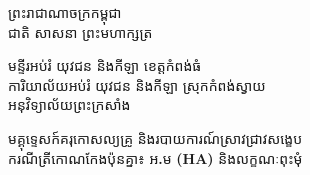 \documentclass[a4paper,12pt]{article}
\newcommand{\enbf}[1]{{\TimesEn\textbf{#1}}}
\newcommand{\khmflourish}{{\Tacteing\fontsize{38pt}{15pt}\selectfont\raisebox{-5pt}{3}}}
\newcommand{\parttitle}[1]{{\muol\fontsize{13pt}{17pt}\selectfont #1}}
\begin{document}
\thispagestyle{firstpage}
\fontsize{11.5pt}{14.92pt}\selectfont
\vspace*{-0.75cm}

\begin{center}
  {\muol\fontsize{13pt}{18pt}\selectfont ព្រះរាជាណាចក្រកម្ពុជា}\\[2pt]
  {\muol\fontsize{12pt}{17pt}\selectfont ជាតិ សាសនា ព្រះមហាក្សត្រ}\\[1pt]
  \khmflourish
\end{center}

\vspace{-12pt}
{\muol\fontsize{10.8pt}{15.5pt}\selectfont
មន្ទីរអប់រំ យុវជន និងកីឡា ខេត្តកំពង់ធំ\\
ការិយាល័យអប់រំ យុវជន និងកីឡា ស្រុកកំពង់ស្វាយ\\
អនុវិទ្យាល័យព្រះក្រសាំង}

\vspace{6pt}
\begin{center}
  \parttitle{មគ្គុទ្ទេសក៍គរុកោសល្យគ្រូ និងរបាយការណ៍ស្រាវជ្រាវសង្ខេប}\\[3pt]
  {\muol\fontsize{11.5pt}{16.5pt}\selectfont ករណីត្រីកោណកែងប៉ុនគ្នា៖ អ\enbf{.}ម \enbf{(HA)} និងលក្ខណៈពុះមុំ}
\end{center}

\vspace{4pt}
\end{document}
